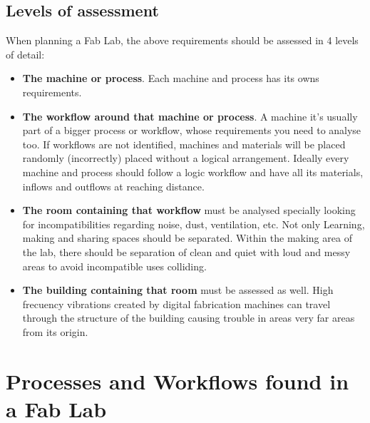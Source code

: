 \documentclass[a4paper,12pt,titlepage]{article}
\begin{document}
\subsection{Levels of assessment}
When planning a Fab Lab, the above requirements should be assessed in 4 levels of detail:
\begin{itemize}
\item \textbf{The machine or process}. Each machine and process has its owns requirements.
\item \textbf{The workflow around that machine or process}. A machine it's usually part of a bigger process or workflow, whose requirements you need to analyse too. If workflows
are not identified, machines and materials will be  placed randomly (incorrectly) placed without a
logical arrangement. Ideally every machine and process should follow a logic workflow and
have all its materials, inflows and outflows at reaching distance.

\item \textbf{The room containing that workflow} must be analysed specially looking for incompatibilities regarding noise, dust, ventilation, etc. Not only Learning, making and sharing spaces should be separated. Within the making
area of the lab, there should be separation of clean and quiet with loud and messy areas to avoid incompatible uses colliding.
\item \textbf{The building containing that room} must be assessed as well. High frecuency vibrations created by digital fabrication machines can travel through the structure of the building causing trouble in areas very far areas from its origin.
\end{itemize}

\clearpage
  
\section{Processes and Workflows found in a Fab Lab}
\end{document}
